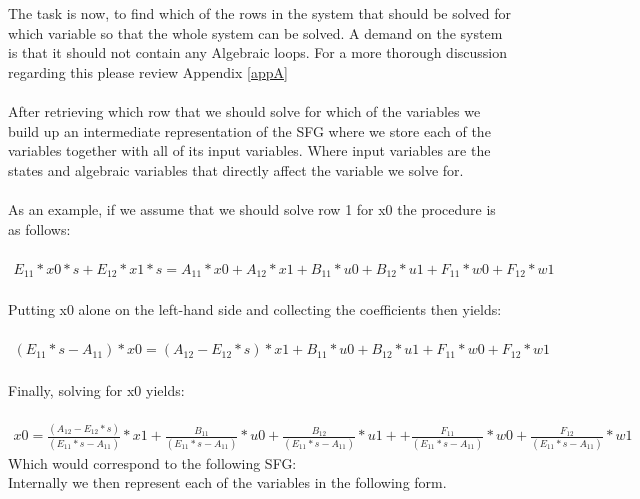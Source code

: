 The task is now, to find which of the rows in the system that should be solved for which variable so that the whole system can be solved. A demand on the system is that it should not contain any Algebraic loops. For a more thorough discussion regarding this please review Appendix \ref{appA}\\\\After retrieving which row that we should solve for which of the variables we build up an intermediate representation of the SFG where we store each of the variables together with all of its input variables. Where input variables are the states and algebraic variables that directly affect the variable we solve for.\\\\
As an example, if we assume that we should solve row 1 for x0 the procedure is as follows:\\\\$\begin{array}{rcl} E_{11}*x0*s  +E_{12}*x1*s=A_{11}*x0  +A_{12}*x1 +B_{11}*u0  +B_{12}*u1  +F_{11}*w0  +F_{12}*w1 \end{array}$\\
\\Putting x0 alone on the left-hand side and collecting the coefficients then yields:\\\\$\begin{array}{rcl} (E_{11}*s-A_{11})*x0  =(A_{12}-E_{12}*s)*x1 +B_{11}*u0  +B_{12}*u1 +F_{11}*w0  +F_{12}*w1 \end{array}$\\\\
Finally, solving for x0 yields:\\\\
$\begin{array}{rcl} x0  = \frac{(A_{12}-E_{12}*s)}{(E_{11}*s-A_{11})}*x1 +\frac{B_{11}}{(E_{11}*s-A_{11})}*u0  +\frac{B_{12}}{(E_{11}*s-A_{11})}*u1 ++\frac{F_{11}}{(E_{11}*s-A_{11})}*w0 +\frac{F_{12}}{(E_{11}*s-A_{11})}*w1\end{array}$\\\newline Which would correspond to the following SFG:\\Internally we then represent each of the variables in the following form.\\\newline
%

